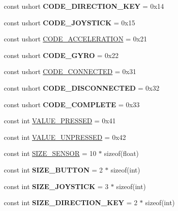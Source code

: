 \begin{DoxyCompactItemize}
\item 
\hypertarget{class_g_cconst_ab69f6e01d674019db0d5a229b157cad6}{}const ushort {\bfseries C\+O\+D\+E\+\_\+\+D\+I\+R\+E\+C\+T\+I\+O\+N\+\_\+\+K\+E\+Y} = 0x14\label{class_g_cconst_ab69f6e01d674019db0d5a229b157cad6}

\item 
\hypertarget{class_g_cconst_a65914551560b5254e65f35a8668e4dff}{}const ushort {\bfseries C\+O\+D\+E\+\_\+\+J\+O\+Y\+S\+T\+I\+C\+K} = 0x15\label{class_g_cconst_a65914551560b5254e65f35a8668e4dff}

\item 
const ushort \hyperlink{class_g_cconst_a84fdd379bbb0355e8d1abec0338c7305}{C\+O\+D\+E\+\_\+\+A\+C\+C\+E\+L\+E\+R\+A\+T\+I\+O\+N} = 0x21
\item 
\hypertarget{class_g_cconst_afdbe82aacd4ebe510c3f8ddaa609b42b}{}const ushort {\bfseries C\+O\+D\+E\+\_\+\+G\+Y\+R\+O} = 0x22\label{class_g_cconst_afdbe82aacd4ebe510c3f8ddaa609b42b}

\item 
const ushort \hyperlink{class_g_cconst_a03588045b902424b55b70524bd81a7d0}{C\+O\+D\+E\+\_\+\+C\+O\+N\+N\+E\+C\+T\+E\+D} = 0x31
\item 
\hypertarget{class_g_cconst_a484076ed934580daba95f65bd86d6c25}{}const ushort {\bfseries C\+O\+D\+E\+\_\+\+D\+I\+S\+C\+O\+N\+N\+E\+C\+T\+E\+D} = 0x32\label{class_g_cconst_a484076ed934580daba95f65bd86d6c25}

\item 
\hypertarget{class_g_cconst_ae0d7a3f3581392fcfbab6ed03a738287}{}const ushort {\bfseries C\+O\+D\+E\+\_\+\+C\+O\+M\+P\+L\+E\+T\+E} = 0x33\label{class_g_cconst_ae0d7a3f3581392fcfbab6ed03a738287}

\item 
const int \hyperlink{class_g_cconst_ab29addae403721e28db58d3d588d7cb6}{V\+A\+L\+U\+E\+\_\+\+P\+R\+E\+S\+S\+E\+D} = 0x41
\item 
const int \hyperlink{class_g_cconst_ae71573553c10f6fa0dce4c8ef2a27e10}{V\+A\+L\+U\+E\+\_\+\+U\+N\+P\+R\+E\+S\+S\+E\+D} = 0x42
\item 
const int \hyperlink{class_g_cconst_a13a353e3da52e3a0454487664c360dab}{S\+I\+Z\+E\+\_\+\+S\+E\+N\+S\+O\+R} = 10 $\ast$ sizeof(float)
\item 
\hypertarget{class_g_cconst_aab30a3dfdb77464086d7198f78bdbde3}{}const int {\bfseries S\+I\+Z\+E\+\_\+\+B\+U\+T\+T\+O\+N} = 2 $\ast$ sizeof(int)\label{class_g_cconst_aab30a3dfdb77464086d7198f78bdbde3}

\item 
\hypertarget{class_g_cconst_aa79a153c70b038789d1970014fe78fdd}{}const int {\bfseries S\+I\+Z\+E\+\_\+\+J\+O\+Y\+S\+T\+I\+C\+K} = 3 $\ast$ sizeof(int)\label{class_g_cconst_aa79a153c70b038789d1970014fe78fdd}

\item 
\hypertarget{class_g_cconst_ade9e9f452273b6219344ed7f6e45b3db}{}const int {\bfseries S\+I\+Z\+E\+\_\+\+D\+I\+R\+E\+C\+T\+I\+O\+N\+\_\+\+K\+E\+Y} = 2 $\ast$ sizeof(int)\label{class_g_cconst_ade9e9f452273b6219344ed7f6e45b3db}

\end{DoxyCompactItemize}


